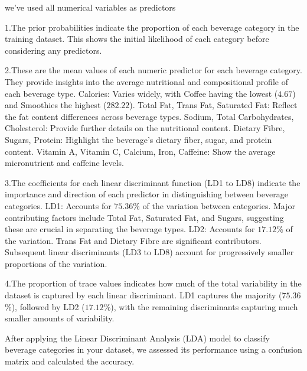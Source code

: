 \documentclass[
]{article}
\begin{document}
we've used all numerical variables as predictors

1.The prior probabilities indicate the proportion of each beverage
category in the training dataset. This shows the initial likelihood of
each category before considering any predictors.

2.These are the mean values of each numeric predictor for each beverage
category. They provide insights into the average nutritional and
compositional profile of each beverage type. Calories: Varies widely,
with Coffee having the lowest (\(4.67\)) and Smoothies the highest
(\(282.22\)). Total Fat, Trans Fat, Saturated Fat: Reflect the fat
content differences across beverage types. Sodium, Total Carbohydrates,
Cholesterol: Provide further details on the nutritional content. Dietary
Fibre, Sugars, Protein: Highlight the beverage's dietary fiber, sugar,
and protein content. Vitamin A, Vitamin C, Calcium, Iron, Caffeine: Show
the average micronutrient and caffeine levels.

3.The coefficients for each linear discriminant function (LD1 to LD8)
indicate the importance and direction of each predictor in
distinguishing between beverage categories. LD1: Accounts for
\(75.36\)\% of the variation between categories. Major contributing
factors include Total Fat, Saturated Fat, and Sugars, suggesting these
are crucial in separating the beverage types. LD2: Accounts for
\(17.12\)\% of the variation. Trans Fat and Dietary Fibre are
significant contributors. Subsequent linear discriminants (LD3 to LD8)
account for progressively smaller proportions of the variation.

4.The proportion of trace values indicates how much of the total
variability in the dataset is captured by each linear discriminant. LD1
captures the majority (\(75.36\)\%), followed by LD2 (\(17.12\)\%), with
the remaining discriminants capturing much smaller amounts of
variability.

After applying the Linear Discriminant Analysis (LDA) model to classify
beverage categories in your dataset, we assessed its performance using a
confusion matrix and calculated the accuracy.
\end{document}
